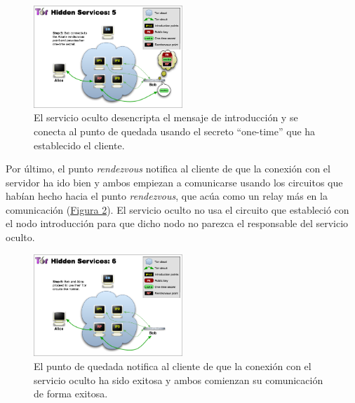 \documentclass[10pt,a4paper,spanish]{article}
\begin{document}
\begin{figure}[!h]
    \centering
    \includegraphics[width=0.5\textwidth]{THS-5}
    \caption{El servicio oculto desencripta el mensaje de introducción y se conecta al punto de quedada usando el secreto ``one-time'' que ha establecido el cliente.}
    \label{ths5}
\end{figure}

Por último, el punto \textit{rendezvous} notifica al cliente de que la conexión con el servidor ha ido bien y ambos empiezan a comunicarse usando los circuitos que habían hecho hacia el punto \textit{rendezvous}, que acúa como un relay más en la comunicación (\hyperref[ths6]{Figura \ref*{ths6}}). El servicio oculto no usa el circuito que estableció con el nodo introducción para que dicho nodo no parezca el responsable del servicio oculto. 

\begin{figure}[!h]
    \centering
    \includegraphics[width=0.5\textwidth]{THS-6}
    \caption{El punto de quedada notifica al cliente de que la conexión con el servicio oculto ha sido exitosa y ambos comienzan su comunicación de forma exitosa.}
    \label{ths6}
\end{figure}

\end{document}
